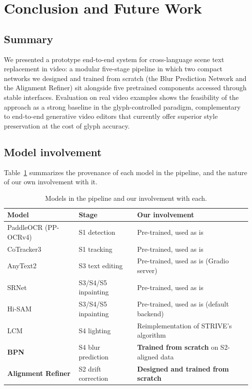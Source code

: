 \section{Conclusion and Future Work}
\label{sec:conclusion}

\subsection{Summary}
\label{sec:conclusion:summary}

We presented a prototype end-to-end system for cross-language scene
text replacement in video: a modular five-stage pipeline in which
two compact networks we designed and trained from scratch (the
Blur Prediction Network and the Alignment Refiner) sit alongside
five pretrained components accessed through stable interfaces.
Evaluation on real video examples shows the feasibility of the
approach as a strong baseline in the glyph-controlled paradigm,
complementary to end-to-end generative video editors that
currently offer superior style preservation at the cost of glyph
accuracy.

\subsection{Model involvement}
\label{sec:conclusion:involvement}

Table~\ref{tab:involvement} summarizes the provenance of each model
in the pipeline, and the nature of our own involvement with it.

\begin{table}[H]
  \centering
  \caption{Models in the pipeline and our involvement with each.}
  \label{tab:involvement}
  \small
  \setlength{\tabcolsep}{4pt}
  \begin{tabular}{lll}
    \toprule
    Model & Stage & Our involvement \\
    \midrule
    PaddleOCR (PP-OCRv4) & S1 detection       & Pre-trained, used as is \\
    CoTracker3           & S1 tracking        & Pre-trained, used as is \\
    AnyText2             & S3 text editing    & Pre-trained, used as is (Gradio server) \\
    SRNet                & S3/S4/S5 inpainting & Pre-trained, used as is \\
    Hi-SAM               & S3/S4/S5 inpainting & Pre-trained, used as is (default backend) \\
    LCM                  & S4 lighting        & Reimplementation of STRIVE's algorithm \\
    \textbf{BPN}         & S4 blur prediction & \textbf{Trained from scratch} on S2-aligned data \\
    \textbf{Alignment Refiner} & S2 drift correction & \textbf{Designed and trained from scratch} \\
    \bottomrule
  \end{tabular}
\end{table}

